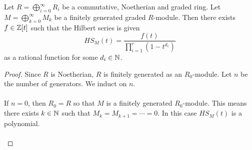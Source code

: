 \documentclass[a4paper]{article}
\begin{document}
\begin{prp}{}{} Let $R=\bigoplus_{i=0}^\infty R_i$ be a commutative, Noetherian and graded ring. Let $M=\bigoplus_{k=0}^\infty M_k$ be a finitely generated graded $R$-module. Then there exists $f\in\mathbb{Z}[t]$ such that the Hilbert series is given $$HS_M(t)=\frac{f(t)}{\prod_{i=1}^r(1-t^{d_i})}$$ as a rational function for some $d_i\in\mathbb{N}$. \tcbline
\begin{proof}
Since $R$ is Noetherian, $R$ is finitely generated as an $R_0$-module. Let $n$ be the number of generators. We induct on $n$. \\~\\

If $n=0$, then $R_0=R$ so that $M$ is a finitely generated $R_0$-module. This means there exists $k\in\mathbb{N}$ such that $M_k=M_{k+1}=\cdots=0$. In this case $HS_M(t)$ is a polynomial. \\~\\


\end{proof}
\end{prp}
\end{document}
